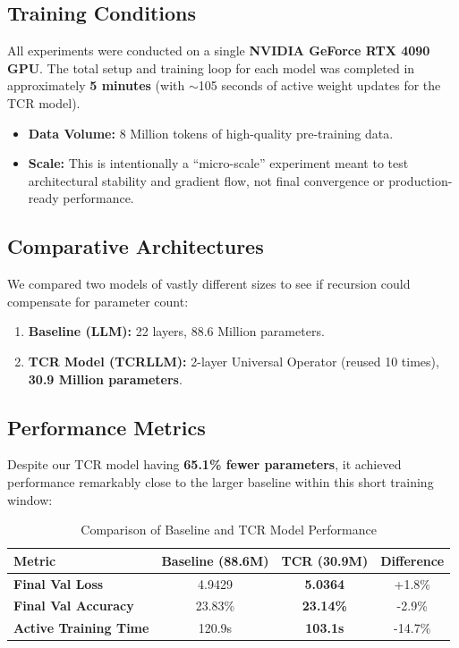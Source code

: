 \documentclass[11pt, a4paper]{article}
\begin{document}
\subsection{Training Conditions}
All experiments were conducted on a single \textbf{NVIDIA GeForce RTX 4090 GPU}. The total setup and training loop for each model was completed in approximately \textbf{5 minutes} (with $\sim$105 seconds of active weight updates for the TCR model). 

\begin{itemize}
    \item \textbf{Data Volume:} 8 Million tokens of high-quality pre-training data.
    \item \textbf{Scale:} This is intentionally a ``micro-scale'' experiment meant to test architectural stability and gradient flow, not final convergence or production-ready performance.
\end{itemize}

\subsection{Comparative Architectures}
We compared two models of vastly different sizes to see if recursion could compensate for parameter count:

\begin{enumerate}
    \item \textbf{Baseline (LLM):} 22 layers, 88.6 Million parameters.
    \item \textbf{TCR Model (TCRLLM):} 2-layer Universal Operator (reused 10 times), \textbf{30.9 Million parameters}.
\end{enumerate}

\subsection{Performance Metrics}
Despite our TCR model having \textbf{65.1\% fewer parameters}, it achieved performance remarkably close to the larger baseline within this short training window:

\begin{table}[h]
\centering
\begin{tabular}{lccc}
\toprule
\textbf{Metric} & \textbf{Baseline (88.6M)} & \textbf{TCR (30.9M)} & \textbf{Difference} \\
\midrule
\textbf{Final Val Loss} & 4.9429 & \textbf{5.0364} & +1.8\% \\
\textbf{Final Val Accuracy} & 23.83\% & \textbf{23.14\%} & -2.9\% \\
\textbf{Active Training Time} & 120.9s & \textbf{103.1s} & -14.7\% \\
\bottomrule
\end{tabular}
\caption{Comparison of Baseline and TCR Model Performance}
\label{tab:performance}
\end{table}
\end{document}
